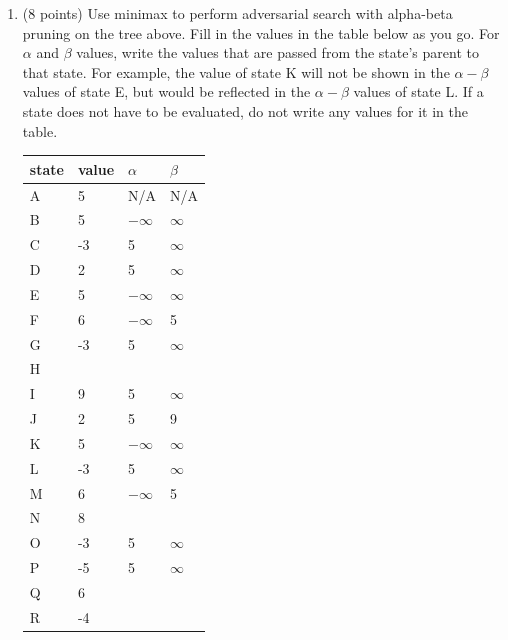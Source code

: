 \documentclass[12pt]{article}
\newenvironment{qparts}{\begin{enumerate}[{(}a{)}]}{\end{enumerate}}
\begin{document}
\begin{qparts}
  \item (8 points) Use minimax to perform adversarial search with alpha-beta pruning on the tree above. Fill in the values in the table below as you go. For $\alpha$ and $\beta$ values, write the values that are passed from the state's parent to that state. For example, the value of state K will not be shown in the $\alpha-\beta$ values of state E, but would be reflected in the $\alpha-\beta$ values of state L. If a state does not have to be evaluated, do not write any values for it in the table.

  \begin{table}[t]
    \begin{center}
      \begin{tabular}{|l|m{5em}|m{5em}|m{5em}|}
        \hline
        state & value & $\alpha$  & $\beta$  \\ \hline
        A     & 5     & N/A       & N/A      \\ \hline
        B     & 5     & $-\infty$ & $\infty$ \\ \hline
        C     & -3    & 5         & $\infty$ \\ \hline
        D     & 2     & 5         & $\infty$ \\ \hline
        E     & 5     & $-\infty$ & $\infty$ \\ \hline
        F     & 6     & $-\infty$ & 5        \\ \hline
        G     & -3    & 5         & $\infty$ \\ \hline
        H     &       &           &          \\ \hline
        I     & 9     & 5         & $\infty$ \\ \hline
        J     & 2     & 5         & 9        \\ \hline
        K     & 5     & $-\infty$ & $\infty$ \\ \hline
        L     & -3    & 5         & $\infty$ \\ \hline
        M     & 6     & $-\infty$ & 5        \\ \hline
        N     & 8     &           &          \\ \hline
        O     & -3    & 5         & $\infty$ \\ \hline
        P     & -5    & 5         & $\infty$ \\ \hline
        Q     & 6     &           &          \\ \hline
        R     & -4    &           &          \\ \hline

\end{tabular}
\end{center}
\end{table}
\end{qparts}
\end{document}
